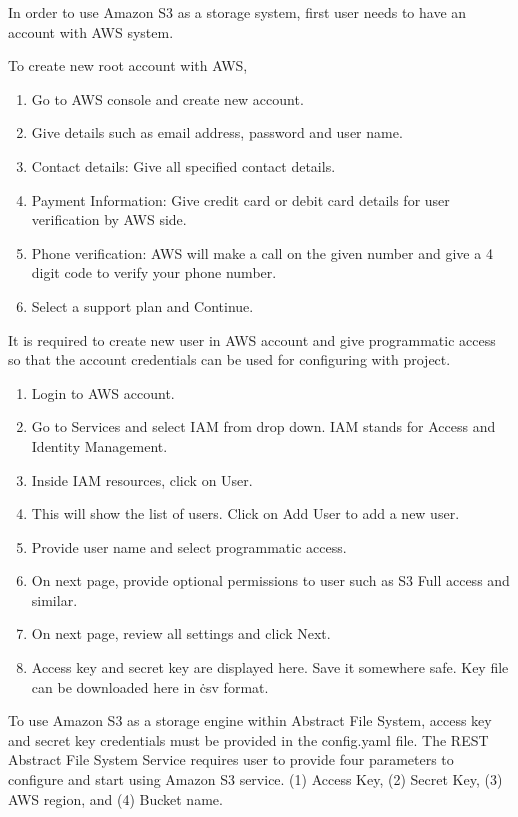 In order to use Amazon S3 as a storage system, first user needs to have an
account with AWS system.

To create new root account with AWS,
\begin{enumerate}
\item Go to AWS console and create new account.
\item Give details such as email address, password and user name.
\item Contact details: Give all specified contact details.
\item Payment Information: Give credit card or debit card details for
  user verification by AWS side.
\item Phone verification: AWS will make a call on the given number and
  give a 4 digit code to verify your phone number.
    \item Select a support plan and Continue.
\end{enumerate}



It is required to create new user in AWS account and give 
programmatic access so that the account credentials can be 
used for configuring with project.

\begin{enumerate}
    \item Login to AWS account.
    \item Go to Services and select IAM from drop down. 
	IAM stands for Access and Identity Management.
    \item Inside IAM resources, click on User.
    \item This will show the list of users. Click on Add User to add a new 
user.
    \item Provide user name and select programmatic access.
    \item On next page, provide optional permissions to user such as S3 Full
access and similar.
    \item On next page, review all settings and click Next.
    \item Access key and secret key are displayed here. Save it somewhere safe.
Key file can be downloaded here in \.csv format.
\end{enumerate}


To use Amazon S3 as a storage engine within Abstract File System,
access key and secret key credentials must be provided in the
config.yaml file. The REST Abstract File System Service requires user
to provide four parameters to configure and start using Amazon S3
service.  (1) Access Key, (2) Secret Key, (3) AWS region, and (4)
Bucket name.


